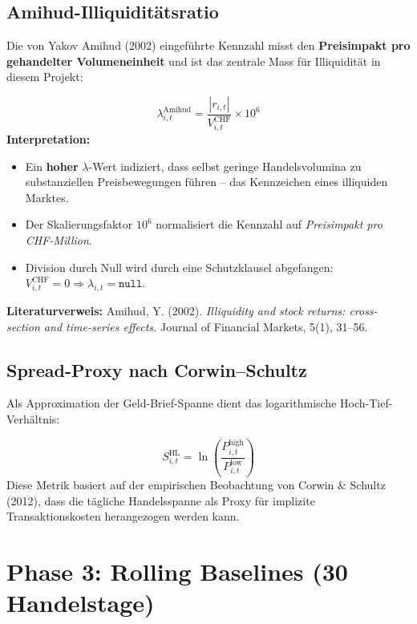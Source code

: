\documentclass[12pt, a4paper, oneside]{report}
\begin{document}
\subsection{Amihud-Illiquiditätsratio}

Die von Yakov Amihud (2002) eingeführte Kennzahl misst den \textbf{Preisimpakt pro gehandelter Volumeneinheit} und ist das zentrale Mass für Illiquidität in diesem Projekt:

\begin{mathbox}
\[
  \boxed{\;\lambda_{i,t}^{\text{Amihud}} = \frac{|r_{i,t}|}{V_{i,t}^{\text{CHF}}} \times 10^{6}\;}
\]
\textbf{Interpretation:}
\begin{itemize}
  \item Ein \textbf{hoher} $\lambda$-Wert indiziert, dass selbst geringe Handelsvolumina zu substanziellen Preisbewegungen führen -- das Kennzeichen eines illiquiden Marktes.
  \item Der Skalierungsfaktor $10^6$ normalisiert die Kennzahl auf \textit{Preisimpakt pro CHF-Million}.
  \item Division durch Null wird durch eine Schutzklausel abgefangen: $V_{i,t}^{\text{CHF}} = 0 \Rightarrow \lambda_{i,t} = \texttt{null}$.
\end{itemize}

\textbf{Literaturverweis:} Amihud, Y. (2002). \textit{Illiquidity and stock returns: cross-section and time-series effects.} Journal of Financial Markets, 5(1), 31–56.
\end{mathbox}

\subsection{Spread-Proxy nach Corwin--Schultz}

Als Approximation der Geld-Brief-Spanne dient das logarithmische Hoch-Tief-Verhältnis:

\begin{mathbox}
\[
  S_{i,t}^{\text{HL}} = \ln\!\left(\frac{P_{i,t}^{\text{high}}}{P_{i,t}^{\text{low}}}\right)
\]
Diese Metrik basiert auf der empirischen Beobachtung von Corwin \& Schultz (2012), dass die tägliche Handelsspanne als Proxy für implizite Transaktionskosten herangezogen werden kann.
\end{mathbox}

\section{Phase 3: Rolling Baselines (30 Handelstage)}
\end{document}
